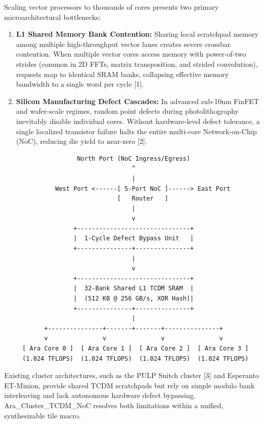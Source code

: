 \documentclass[journal,10pt,twocolumn]{IEEEtran}
\begin{document}
Scaling vector processors to thousands of cores presents two primary microarchitectural bottlenecks:
\begin{enumerate}
  \item \textbf{L1 Shared Memory Bank Contention:} Sharing local scratchpad memory among multiple high-throughput vector lanes creates severe crossbar contention. When multiple vector cores access memory with power-of-two strides (common in 2D FFTs, matrix transposition, and strided convolution), requests map to identical SRAM banks, collapsing effective memory bandwidth to a single word per cycle [1].
  \item \textbf{Silicon Manufacturing Defect Cascades:} In advanced sub-10nm FinFET and wafer-scale regimes, random point defects during photolithography inevitably disable individual cores. Without hardware-level defect tolerance, a single localized transistor failure halts the entire multi-core Network-on-Chip (NoC), reducing die yield to near-zero [2].
\end{enumerate}

\begin{footnotesize}\begin{verbatim}
                    North Port (NoC Ingress/Egress)
                                   ^
                                   |
              West Port <------[ 5-Port NoC ]------> East Port
                               [   Router   ]
                                   |
                                   v
                   +-------------------------------+
                   |  1-Cycle Defect Bypass Unit   |
                   +---------------+---------------+
                                   |
                                   v
                   +-------------------------------+
                   |  32-Bank Shared L1 TCDM SRAM  |
                   |  (512 KB @ 256 GB/s, XOR Hash)|
                   +---------------+---------------+
                                   |
           +---------------+-------+-------+---------------+
           v               v               v               v
     [ Ara Core 0 ]  [ Ara Core 1 ]  [ Ara Core 2 ]  [ Ara Core 3 ]
     (1.024 TFLOPS)  (1.024 TFLOPS)  (1.024 TFLOPS)  (1.024 TFLOPS)
\end{verbatim}\end{footnotesize}

Existing cluster architectures, such as the PULP Snitch cluster [3] and Esperanto ET-Minion, provide shared TCDM scratchpads but rely on simple modulo bank interleaving and lack autonomous hardware defect bypassing. Ara\_Cluster\_TCDM\_NoC resolves both limitations within a unified, synthesizable tile macro.
\end{document}
